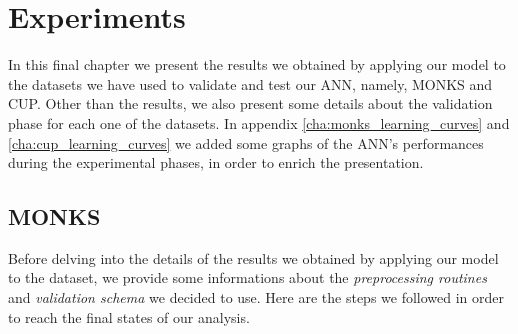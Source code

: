\chapter{Experiments} %
\label{cha:experiments}
    In this final chapter we present the results we obtained by applying our model to the datasets we have used
    to validate and test our ANN, namely, MONKS and CUP. Other than the results, we also present some details
    about the validation phase for each one of the datasets. In appendix \ref{cha:monks_learning_curves} and
    \ref{cha:cup_learning_curves} we added some graphs of the ANN's performances during the experimental phases, in
    order to enrich the presentation.

    \section{MONKS} %
    \label{sec:monks}
        Before delving into the details of the results we obtained by applying our model to the dataset, we
        provide some informations about the \textit{preprocessing routines} and \textit{validation schema} we
        decided to use. Here are the steps we followed in order to reach the final states of our analysis.

